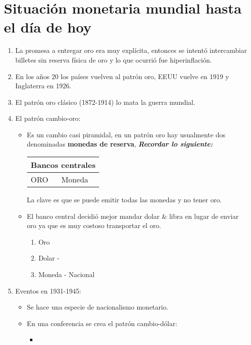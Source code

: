 \section{Situación monetaria mundial hasta el día de hoy}
\begin{enumerate}
    \item La promesa a entregar oro era muy explícita, entonces se intentó intercambiar billetes sin reserva física de oro y lo que ocurrió fue hiperinflación.
    \item En los años 20 los países vuelven al patrón oro, EEUU vuelve en 1919 y Inglaterra en 1926.
    \item El patrón oro clásico (1872-1914) lo mata la guerra mundial. 
    \item El patrón cambio-oro: 
        \begin{itemize}
            \item Es un cambio casi piramidal, en un patrón oro hay usualmente dos denominadas \textbf{monedas de reserva}, \emph{\textbf{Recordar lo siguiente: }} 
            \begin{center}
            \begin{tabular}{ | p{5cm} | p{5cm} | }
             \hline
             \multicolumn{2}{|c|}{Bancos centrales} \\
             \hline
             ORO & Moneda \\  
            \end{tabular}
            \end{center}
            La clave es que se puede emitir todas las monedas y no tener oro.
            
            \item El banco central decidió mejor mandar dolar \& libra en lugar de enviar oro ya que es muy costoso transportar el oro.
                \begin{enumerate}
                    \item Oro 
                    \item Dolar - 
                    \item Moneda - Nacional
                \end{enumerate}
        \end{itemize}

        
        
    \item Eventos en 1931-1945:  
        \begin{itemize}
            \item Se hace una especie de nacionalismo monetario.
            \item En una conferencia se crea el patrón cambio-dólar:
                \begin{itemize}
                    \item 
                \end{itemize}
            

\end{itemize}
\end{enumerate}
